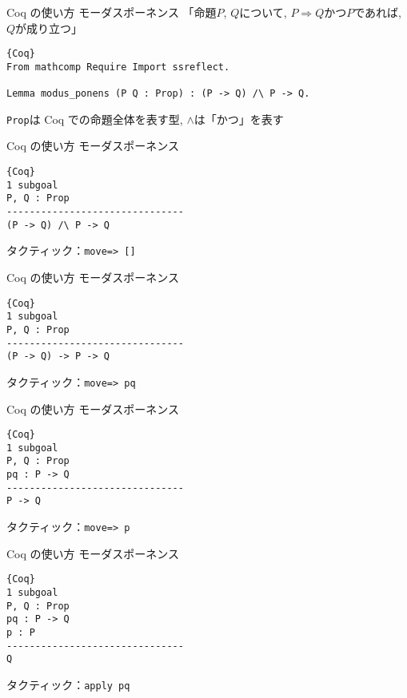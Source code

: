\documentclass[dvipdfmx,cjk]{beamer}
\theoremstyle{mystyle}
\newcommand{\Lra}{\Longrightarrow}
\newcommand{\0}{\textbf{0}}
\begin{document}
\begin{frame}[fragile]{Coq の使い方 モーダスポーネンス}
	「命題$P$, $Q$について, $P \Lra Q$かつ$P$であれば, $Q$が成り立つ」
	\begin{lstlisting}{Coq}
From mathcomp Require Import ssreflect.

Lemma modus_ponens (P Q : Prop) : (P -> Q) /\ P -> Q. \end{lstlisting}
	{\tt Prop}は Coq での命題全体を表す型, $\wedge$は「かつ」を表す
\end{frame}

\begin{frame}[fragile]{Coq の使い方 モーダスポーネンス}
	\begin{screen}
	  \begin{lstlisting}{Coq}
1 subgoal
P, Q : Prop
-------------------------------
(P -> Q) /\ P -> Q \end{lstlisting}
	\end{screen}
	タクティック：{\tt move=> []}
\end{frame}

\begin{frame}[fragile]{Coq の使い方 モーダスポーネンス}
	\begin{screen}
	  \begin{lstlisting}{Coq}
1 subgoal
P, Q : Prop
-------------------------------
(P -> Q) -> P -> Q \end{lstlisting}
	\end{screen}
	タクティック：{\tt move=> pq}
\end{frame}

\begin{frame}[fragile]{Coq の使い方 モーダスポーネンス}
	\begin{screen}
	  \begin{lstlisting}{Coq}
1 subgoal
P, Q : Prop
pq : P -> Q
-------------------------------
P -> Q \end{lstlisting}
	\end{screen}
	タクティック：{\tt move=> p}
\end{frame}

\begin{frame}[fragile]{Coq の使い方 モーダスポーネンス}
	\begin{screen}
	  \begin{lstlisting}{Coq}
1 subgoal
P, Q : Prop
pq : P -> Q
p : P
-------------------------------
Q \end{lstlisting}
	\end{screen}
	タクティック：{\tt apply pq}
\end{frame}
\end{document}
